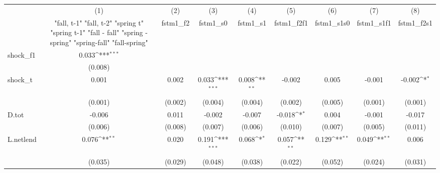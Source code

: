 {
\def\sym#1{\ifmmode^{#1}\else\(^{#1}\)\fi}
\begin{tabular}{l*{8}{c}}
\toprule
            &\multicolumn{1}{c}{(1)}&\multicolumn{1}{c}{(2)}&\multicolumn{1}{c}{(3)}&\multicolumn{1}{c}{(4)}&\multicolumn{1}{c}{(5)}&\multicolumn{1}{c}{(6)}&\multicolumn{1}{c}{(7)}&\multicolumn{1}{c}{(8)}\\
            &\multicolumn{1}{c}{  "fall, t-1" "fall, t-2" "spring t" "spring t-1"  "fall - fall" "spring - spring" "spring-fall" "fall-spring" }&\multicolumn{1}{c}{fstm1\_f2}&\multicolumn{1}{c}{fstm1\_s0}&\multicolumn{1}{c}{fstm1\_s1}&\multicolumn{1}{c}{fstm1\_f2f1}&\multicolumn{1}{c}{fstm1\_s1s0}&\multicolumn{1}{c}{fstm1\_s1f1}&\multicolumn{1}{c}{fstm1\_f2s1}\\
\midrule
shock\_f1    &       0.033\sym{***}&                     &                     &                     &                     &                     &                     &                     \\
            &     (0.008)         &                     &                     &                     &                     &                     &                     &                     \\
\addlinespace
shock\_t     &       0.001         &       0.002         &       0.033\sym{***}&       0.008\sym{**} &      -0.002         &       0.005         &      -0.001         &      -0.002\sym{*}  \\
            &     (0.001)         &     (0.002)         &     (0.004)         &     (0.004)         &     (0.002)         &     (0.005)         &     (0.001)         &     (0.001)         \\
\addlinespace
D.tot       &      -0.006         &       0.011         &      -0.002         &      -0.007         &      -0.018\sym{*}  &       0.004         &      -0.001         &      -0.017         \\
            &     (0.006)         &     (0.008)         &     (0.007)         &     (0.006)         &     (0.010)         &     (0.007)         &     (0.005)         &     (0.011)         \\
\addlinespace
L.netlend   &       0.076\sym{**} &       0.020         &       0.191\sym{***}&       0.068\sym{*}  &       0.057\sym{**} &       0.129\sym{**} &       0.049\sym{**} &       0.006         \\
            &     (0.035)         &     (0.029)         &     (0.048)         &     (0.038)         &     (0.022)         &     (0.052)         &     (0.024)         &     (0.031)         \\

\end{tabular}}
